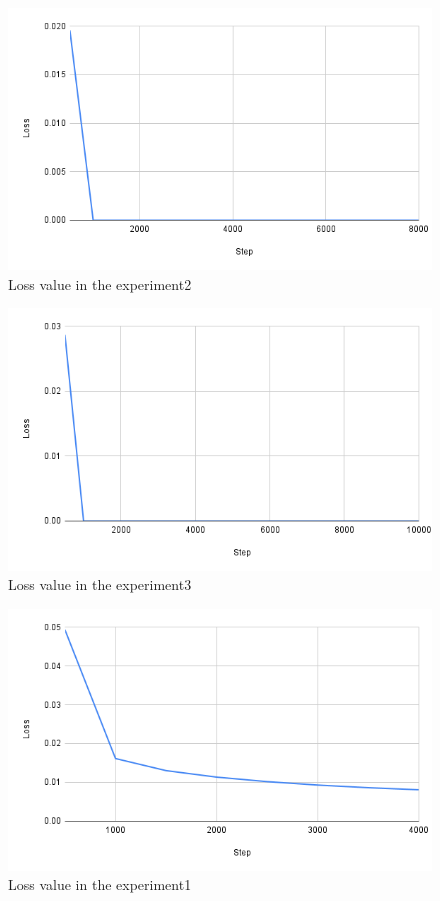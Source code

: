 \begin{figure}[h]
  \centering
  \includegraphics[keepaspectratio, scale=0.31]{images/exp1.1_8000.png}
  \caption{Loss value in the experiment2}
  \label{Fig:exp1.1_8000}
  \end{figure}

\begin{figure}[h]
  \centering
  \includegraphics[keepaspectratio, scale=0.31]{images/exp1.1_10000.png}
  \caption{Loss value in the experiment3}
  \label{Fig:exp1.1_10000}
  \end{figure}

\newpage
\begin{figure}[h]
  \centering
  \includegraphics[keepaspectratio, scale=0.31]{images/exp1.2_4000.png}
  \caption{Loss value in the experiment1}
  \label{Fig:exp1.2_4000}
  \end{figure}
  
